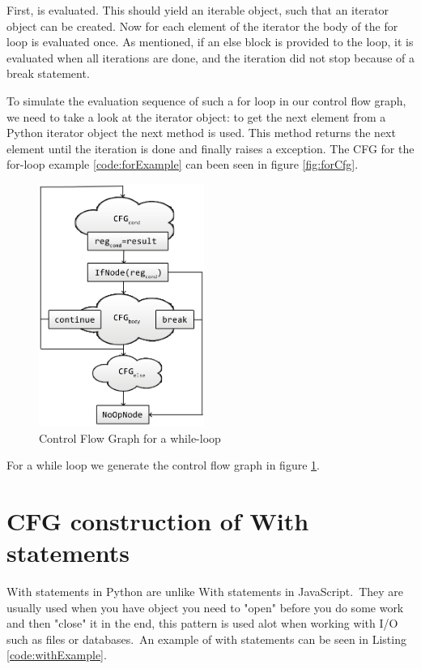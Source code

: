 First,  is evaluated. This should yield an iterable object, such that an iterator object can be created. 
Now for each element of the iterator the body of the for loop is evaluated once. As mentioned, if an else block is provided to the loop, 
it is evaluated when all iterations are done, and the iteration did not stop because of a break statement. 

To simulate the evaluation sequence of such a for loop in our control flow graph, we need to take a look at the iterator object: 
to get the next element from a Python iterator object the next method is used. 
This method returns the next element until the iteration is done and finally raises a  exception. 
The CFG for the for-loop example \ref{code:forExample} can been seen in figure \ref{fig:forCfg}.

\begin{figure}
  \vspace{-20pt}
  \begin{center}
    \includegraphics[width=0.48\textwidth]{images/while.png}
  \end{center}
  \vspace{-10pt}
  \caption{Control Flow Graph for a while-loop}
  \label{fig:whileCfg}
  \vspace{-10pt}
\end{figure}

For a while loop we generate the control flow graph in figure \ref{fig:whileCfg}.

\section{CFG construction of With statements}
With statements in Python are unlike With statements in JavaScript.\ They are usually used when you have object you need to "open" before you do some work and then "close" it in the end, this pattern is used alot when working with I/O such as files or databases.\ An example of with statements can be seen in Listing \ref{code:withExample}.

